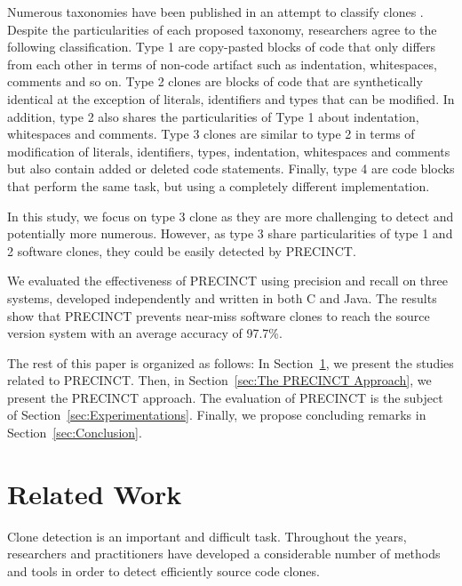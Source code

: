 \documentclass[conference]{IEEEtran}
\begin{document}

Numerous taxonomies have been published in an attempt to classify clones \cite{Mayrand1996,Balazinska1999,Koschke2006,Bellon2007,NeilDavey,Kontogiannis,Kapser}.
Despite the particularities of each proposed taxonomy, researchers agree to the following classification.
Type 1 are copy-pasted blocks of code that only differs from each other in terms of non-code artifact such as indentation, whitespaces, comments and so on.
Type 2 clones are blocks of code that are synthetically identical at the exception of literals, identifiers and types that can be modified.
In addition, type 2 also shares the particularities of Type 1 about indentation, whitespaces and comments.
Type 3 clones are similar to type 2 in terms of modification of literals, identifiers, types, indentation, whitespaces and comments but also contain added or deleted code statements.
Finally, type 4 are code blocks that perform the same task, but using a completely different implementation.

In this study, we focus on type 3 clone as they are more challenging to detect and potentially more numerous.
However, as type 3 share particularities of type 1 and 2 software clones, they could be easily detected by PRECINCT.

We evaluated the effectiveness of PRECINCT using precision and recall on three systems, developed independently and written in both C and Java. The results show that PRECINCT prevents near-miss software clones to reach the source version system with an average accuracy of 97.7\%.

The rest of this paper is organized as follows: In Section~\ref{sec:Related Work}, we present the studies related to PRECINCT. Then, in Section~\ref{sec:The PRECINCT Approach}, we present the PRECINCT approach. The evaluation of PRECINCT is the subject of  Section~\ref{sec:Experimentations}.
Finally, we propose concluding remarks in Section~\ref{sec:Conclusion}.

\section{Related Work}
\label{sec:Related Work}

Clone detection is an important and difficult task. Throughout the years, researchers and practitioners have developed a considerable number of methods and tools in order to detect efficiently source code clones.
\end{document}
